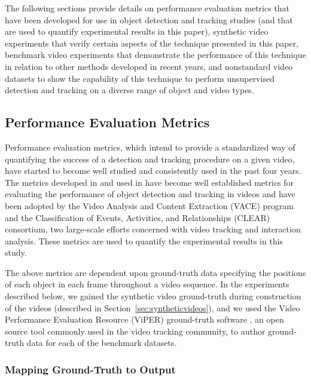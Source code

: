 \documentclass[smallcondensed, final]{svjour3}
\begin{document}
The following sections provide details on performance evaluation metrics that have been developed for use in object detection and tracking studies (and that are used to quantify experimental results in this paper), synthetic video experiments that verify certain aspects of the technique presented in this paper, benchmark video experiments that demonstrate the performance of this technique in relation to other methods developed in recent years, and nonstandard video datasets to show the capability of this technique to perform unsupervised detection and tracking on a diverse range of object and video types.   


\subsection{Performance Evaluation Metrics}

Performance evaluation metrics, which intend to provide a standardized way of quantifying the success of a detection and tracking procedure on a given video, have started to become well studied and consistently used in the past four years. The metrics developed in \cite{kasturi_2008} and used in \cite{ellis_2010, taj_2007, lee_2009} have become well established metrics for evaluating the performance of object detection and tracking in videos and have been adopted by the Video Analysis and Content Extraction (VACE) program and the Classification of Events, Activities, and Relationships (CLEAR) consortium, two large-scale efforts concerned with video tracking and interaction analysis. These metrics are used to quantify the experimental results in this study.

The above metrics are dependent upon ground-truth data specifying the positions of each object in each frame throughout a video sequence. In the experiments described below, we gained the synthetic video ground-truth during construction of the videos (described in Section~\ref{sec:syntheticvideos}), and we used the Video Performance Evaluation Resource (ViPER) ground-truth software \cite{doermann_2000}, an open source tool commonly used in the video tracking community, to author ground-truth data for each of the benchmark datasets.


\subsubsection{Mapping Ground-Truth to Output}
\label{sec:mappingtoground}
\end{document}
